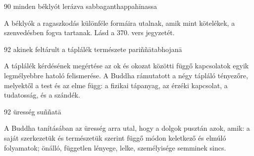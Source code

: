
\begin{notesdescription}

\item[{90}
{minden béklyót lerázva}
{sabbaganthappahīnassa}] \hfill\par

A béklyók a ragaszkodás különféle formáira utalnak, amik mint kötelékek, a szenvedésben fogva tartanak. Lásd a 370. vers jegyzetét.

\item[{92}
{akinek feltárult a táplálék természete}
{pariññātabhojanā}] \hfill\par

A táplálék kérdésének megértése az ok és okozat közötti függő kapcsolatok egyik legmélyebbre hatoló felismerése. A Buddha rámutatott a négy tápláló tényezőre, melyektől a test és az elme függ: a fizikai tápanyag, az érzéki kapcsolat, a tudatosság, és a szándék.

\item[{92}
{üresség}
{suññatā}] \hfill\par

A Buddha tanításában az üresség arra utal, hogy a dolgok pusztán azok, amik: a saját szerkezetük és természetük szerint függő módon keletkező és elmúló folyamatok; önálló, független lényege, lelke, személyisége semminek sincs.

\end{notesdescription}

